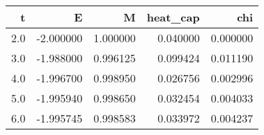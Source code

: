\begin{tabular}{rrrrr}
\toprule
   t &         E &         M &  heat_cap &       chi \\
\midrule
 2.0 & -2.000000 &  1.000000 &  0.040000 &  0.000000 \\
 3.0 & -1.988000 &  0.996125 &  0.099424 &  0.011190 \\
 4.0 & -1.996700 &  0.998950 &  0.026756 &  0.002996 \\
 5.0 & -1.995940 &  0.998650 &  0.032454 &  0.004033 \\
 6.0 & -1.995745 &  0.998583 &  0.033972 &  0.004237 \\
\bottomrule
\end{tabular}
